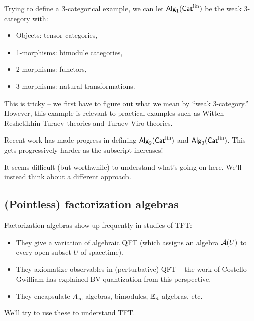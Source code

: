 \begin{ex}
	Trying to define a 3-categorical example, we can let $\mathsf{Alg}_1(\mathsf{Cat}^{\textrm{lin}})$ be the weak 3-category with:
	\begin{itemize}
		\item Objects: tensor categories,
		\item 1-morphisms: bimodule categories,
		\item 2-morphisms: functors,
		\item 3-morphisms: natural transformations.
	\end{itemize}
	This is tricky -- we first have to figure out what we mean by ``weak 3-category.''
	However, this example is relevant to practical examples such as Witten-Reshetikhin-Turaev theories and Turaev-Viro theories.
\end{ex}

\begin{ex}
	Recent work has made progress in defining $\mathsf{Alg}_2(\mathsf{Cat}^{\textrm{lin}})$ and $\mathsf{Alg}_3(\mathsf{Cat}^{\textrm{lin}})$.
	This gets progressively harder as the subscript increases!
\end{ex}

It seems difficult (but worthwhile) to understand what's going on here.
We'll instead think about a different approach.

\subsection{(Pointless) factorization algebras}

Factorization algebras show up frequently in studies of TFT:
\begin{itemize}
	\item They give a variation of algebraic QFT (which assigns an algebra $\mathcal{A}(U)$ to every open subset $U$ of spacetime).
	\item They axiomatize observables in (perturbative) QFT -- the work of Costello-Gwilliam has explained BV quantization from this perspective.
	\item They encapsulate $A_\infty$-algebras, bimodules, $\mathbb{E}_n$-algebras, etc.
\end{itemize}
We'll try to use these to understand TFT.


